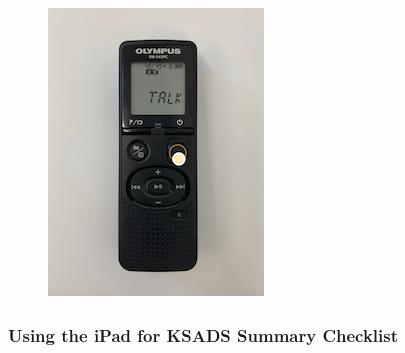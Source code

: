 \documentclass[]{book}
\begin{document}
\begin{figure}
\centering
\includegraphics{images/ksads/3.png}
\caption{}
\end{figure}

\hypertarget{using-the-ipad-for-ksads-summary-checklist}{%
\subsubsection{Using the iPad for KSADS Summary Checklist}\label{using-the-ipad-for-ksads-summary-checklist}}
\end{document}
